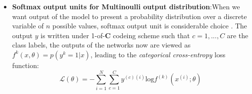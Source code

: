 \begin{itemize}
\begin{equation}
    \end{equation}
    \item \textbf{Softmax output units for Multinoulli output distribution}:When we want output of the model to present a 
    probability distribution over a discrete variable of $n$ possible values, softmax output unit is considerable choice \cite{Goodfellow-et-al-2016}. 
    The output $y$ is written under 1-of-\textbf{C} codeing scheme such that $c = 1,...,C$ are the class labels, 
    the outputs of the networks now are viewed as $f^{k}(x,\theta) = p(y^{k}=1|x)$, 
    leading to the \textit{categorical cross-entropy} loss function:
    \begin{equation}
        \mathcal{L}(\theta) = - \underset{i=1}{\overset{N}{\sum}}\underset{c=1}{\overset{C}{\sum}}y^{(c)(i)}\text{log}f^{(k)}(x^{(i)};\theta)
    \end{equation}
\end{itemize}

